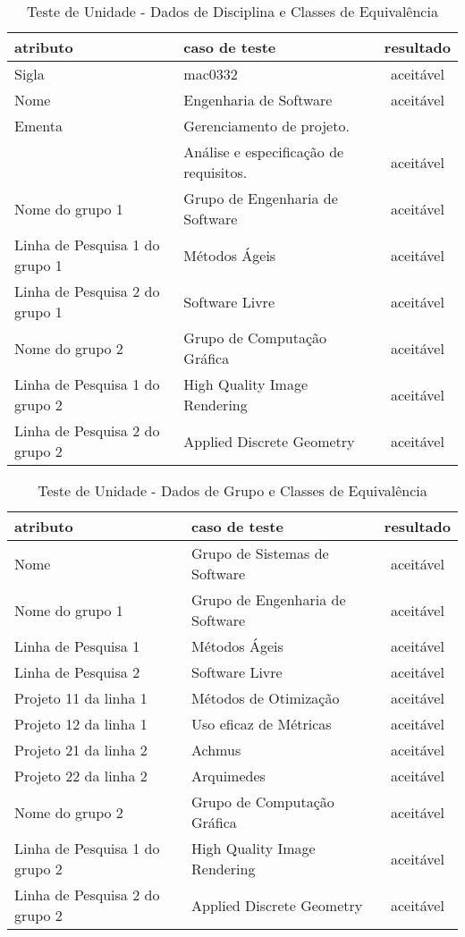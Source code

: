 \documentclass[11pt, a4paper]{book}
\begin{document}
\begin{table}
\renewcommand{\arraystretch}{1.3}
 \caption{Teste de Unidade - Dados de Disciplina e Classes de Equivalência}
  \label{tab:table1}
\centering
\begin{tabular}[htb]{l|l|c}
\hline\hline
atributo & caso de teste & resultado\\
\hline
Sigla & mac0332 & aceitável \\
Nome& Engenharia de Software & aceitável \\
Ementa & Gerenciamento de projeto. & \\
             & Análise e especificação de requisitos. & aceitável \\

Nome do grupo 1 & Grupo de Engenharia de Software & aceitável \\
Linha de Pesquisa 1 do grupo 1& Métodos Ágeis & aceitável \\
Linha de Pesquisa 2 do grupo 1& Software Livre & aceitável \\

Nome do grupo 2 & Grupo de Computação Gráfica & aceitável \\
Linha de Pesquisa 1 do grupo 2& High Quality Image Rendering & aceitável \\
Linha de Pesquisa 2 do grupo 2& Applied Discrete Geometry & aceitável \\

\hline 
\end{tabular}
\end{table}


\begin{table}
\renewcommand{\arraystretch}{1.3}
 \caption{Teste de Unidade - Dados de Grupo e Classes de Equivalência}
  \label{tab:table2}
\centering
\begin{tabular}[htb]{l|l|c}
\hline\hline
atributo & caso de teste & resultado\\
\hline
Nome& Grupo de Sistemas de Software & aceitável \\

Nome do grupo 1 & Grupo de Engenharia de Software & aceitável \\
Linha de Pesquisa 1& Métodos Ágeis & aceitável \\
Linha de Pesquisa 2& Software Livre & aceitável \\

Projeto 11 da linha 1& Métodos de Otimização & aceitável \\
Projeto 12 da linha 1 &  Uso eficaz de Métricas & aceitável \\
Projeto 21 da linha 2& Achmus & aceitável \\
Projeto 22 da linha 2  &  Arquimedes & aceitável \\

Nome do grupo 2 & Grupo de Computação Gráfica & aceitável \\
Linha de Pesquisa 1 do grupo 2& High Quality Image Rendering & aceitável \\
Linha de Pesquisa 2 do grupo 2& Applied Discrete Geometry & aceitável \\

\hline 
\end{tabular}
\end{table}
\end{document}

